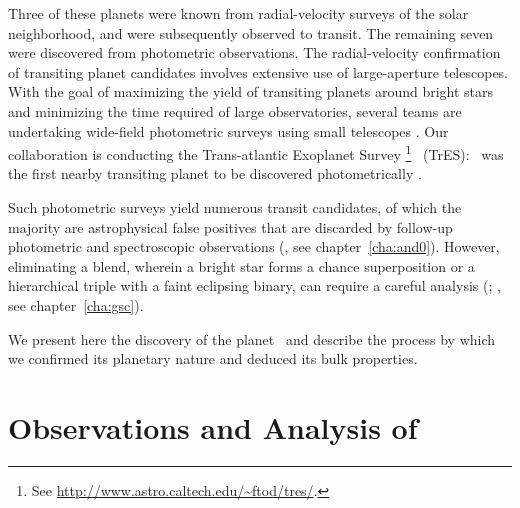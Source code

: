 Three of these planets were known from radial-velocity surveys of the
solar neighborhood, and were subsequently observed to transit.  The
remaining seven were discovered from photometric observations. The
radial-velocity confirmation of transiting planet candidates involves
extensive use of large-aperture telescopes. With the goal of
maximizing the yield of transiting planets around bright stars and
minimizing the time required of large observatories, several teams are
undertaking wide-field photometric surveys using small telescopes
\citep[for a review, see][]{Charbonneau_Brown_Burrows:PPV:2007a}. Our
collaboration is conducting the Trans-atlantic Exoplanet Survey%
\footnote{See \url{http://www.astro.caltech.edu/\~ftod/tres/}.}%
\ (TrES): \tresOne\ was the first nearby transiting planet to be
discovered photometrically \citep{Alonso_Brown_Torres:apjl:2004a}.

Such photometric surveys yield numerous transit candidates, of which
the majority are astrophysical false positives that are discarded by
follow-up photometric and spectroscopic observations
(\citealp[e.g.,][]{ODonovan_Charbonneau_Alonso:apj:2007a}, see chapter~\ref{cha:and0}).%
However, eliminating a blend, wherein a bright star forms a chance
superposition or a hierarchical triple with a faint eclipsing binary,
can require a careful analysis
(\citealp[][]{Torres_Konacki_Sasselov:apj:2004b,%
  Mandushev_Torres_Latham:apj:2005a}; \citealp{ODonovan_Charbonneau_Torres:apj:2006a}, see chapter~\ref{cha:gsc}).%

We present here the discovery of the planet \tresTwo\ and describe the process by which we confirmed its planetary nature and deduced its bulk properties.

\section{Observations and Analysis of \tresTwo}\label{cha:tres2:sec:observations}

